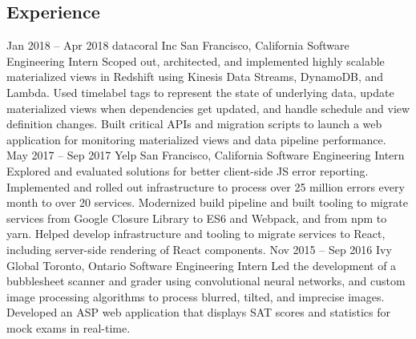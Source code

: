 \documentclass{resume}
\begin{document}
  \begin{main}
    \vspace{0.2cm}%
    \section{Experience}
      \begin{entrylist}
        \rightentry%
          {Jan 2018 -- Apr 2018}%
          {datacoral Inc}%
          {San Francisco, California}%
          {Software Engineering Intern}%
          {\createlist%
            {%
              Scoped out, architected, and implemented highly scalable materialized views in %
              Redshift using Kinesis Data Streams, DynamoDB, and Lambda. %
            }%
            {%
              Used timelabel tags to represent the state of underlying data, update materialized %
              views when dependencies get updated, and handle schedule and view definition %
              changes. %
            }%
            {%
              Built critical APIs and migration scripts to launch a web application for monitoring %
              materialized views and data pipeline performance. %
            }%
          }
        \rightentry%
          {May 2017 -- Sep 2017}%
          {Yelp}%
          {San Francisco, California}%
          {Software Engineering Intern}%
          {\createlist%
            {%
              Explored and evaluated solutions for better client-side JS error reporting. %
            }%
            {%
              Implemented and rolled out infrastructure to process over 25 million errors every %
              month to over 20 services. %
            }%
            {%
              Modernized build pipeline and built tooling to migrate services from Google Closure %
              Library to ES6 and Webpack, and from npm to yarn. %
            }%
            {%
              Helped develop infrastructure and tooling to migrate services to React, including %
              server-side rendering of React components. %
            }%
          }
        \rightentry%
          {Nov 2015 -- Sep 2016}%
          {Ivy Global}%
          {Toronto, Ontario}%
          {Software Engineering Intern}%
          {\createlist%
            {%
              Led the development of a bubblesheet scanner and grader using convolutional neural %
              networks, and custom image processing algorithms to process blurred, tilted, and %
              imprecise images. %
            }%
            {%
              Developed an ASP web application that displays SAT scores and statistics for mock %
              exams in real-time. %
            }%
          }
      \end{entrylist}

\end{main}
\end{document}

